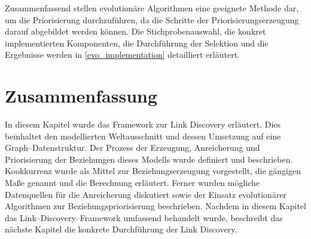 Zusammenfassend stellen evolutionäre Algorithmen eine geeignete Methode dar, um die Priorisierung durchzuführen, da die Schritte der Priorisierungserzeugung darauf abgebildet werden können. Die Stichprobenauswahl, die konkret implementierten Komponenten, die Durchführung der Selektion und die Ergebnisse werden in \cref{evo_implementation} detailliert erläutert.

\section{Zusammenfassung}

In diesem Kapitel wurde das Framework zur Link Discovery erläutert. Dies beinhaltet den modellierten Weltausschnitt und dessen Umsetzung auf eine Graph--Datenstruktur. Der Prozess der Erzeugung, Anreicherung und Priorisierung der Beziehungen dieses Modells wurde definiert und beschrieben. Kookkurrenz wurde als Mittel zur Beziehungserzeugung vorgestellt, die gängigen Maße genannt und die Berechnung erläutert. Ferner wurden mögliche Datenquellen für die Anreicherung diskutiert sowie der Einsatz evolutionärer Algorithmen zur Beziehungspriorisierung beschrieben. Nachdem in diesem Kapitel das Link--Discovery--Framework umfassend behandelt wurde, beschreibt das nächste Kapitel die konkrete Durchführung der Link Discovery.
